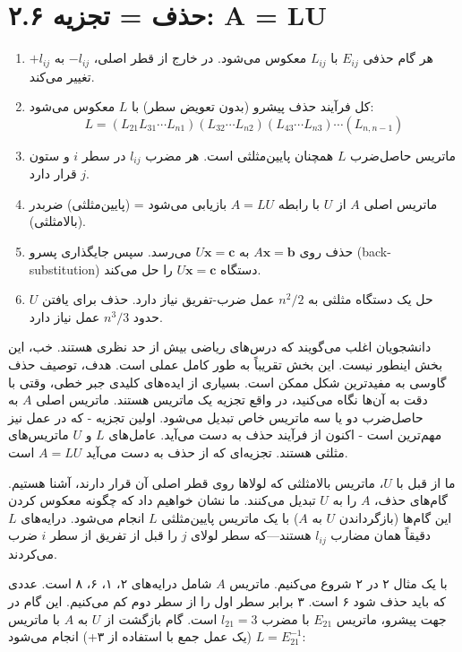\documentclass[12pt, a4paper]{book}
\begin{document}
	
	\onehalfspacing
	
	\section*{۲.۶ حذف = تجزیه: A = LU}
	
	\begin{enumerate}
		\item هر گام حذفی $E_{ij}$ با $L_{ij}$ معکوس می‌شود. در خارج از قطر اصلی، $-l_{ij}$ به $+l_{ij}$ تغییر می‌کند.
		\item کل فرآیند حذف پیشرو (بدون تعویض سطر) با $L$ معکوس می‌شود:
		\[ L = (L_{21}L_{31} \cdots L_{n1})(L_{32} \cdots L_{n2})(L_{43} \cdots L_{n3}) \cdots (L_{n,n-1}) \]
		\item ماتریس حاصل‌ضرب $L$ همچنان پایین‌مثلثی است. هر مضرب $l_{ij}$ در سطر $i$ و ستون $j$ قرار دارد.
		\item ماتریس اصلی $A$ از $U$ با رابطه $A = LU$ بازیابی می‌شود = (پایین‌مثلثی) ضربدر (بالامثلثی).
		\item حذف روی $A\mathbf{x} = \mathbf{b}$ به $U\mathbf{x} = \mathbf{c}$ می‌رسد. سپس جایگذاری پسرو (back-substitution) دستگاه $U\mathbf{x} = \mathbf{c}$ را حل می‌کند.
		\item حل یک دستگاه مثلثی به $n^2/2$ عمل ضرب-تفریق نیاز دارد. حذف برای یافتن $U$ حدود $n^3/3$ عمل نیاز دارد.
	\end{enumerate}
	
	دانشجویان اغلب می‌گویند که درس‌های ریاضی بیش از حد نظری هستند. خب، این بخش اینطور نیست. این بخش تقریباً به طور کامل عملی است. هدف، توصیف حذف گاوسی به مفیدترین شکل ممکن است. بسیاری از ایده‌های کلیدی جبر خطی، وقتی با دقت به آن‌ها نگاه می‌کنید، در واقع تجزیه یک ماتریس هستند. ماتریس اصلی $A$ به حاصل‌ضرب دو یا سه ماتریس خاص تبدیل می‌شود. اولین تجزیه - که در عمل نیز مهم‌ترین است - اکنون از فرآیند حذف به دست می‌آید. عامل‌های $L$ و $U$ ماتریس‌های مثلثی هستند. تجزیه‌ای که از حذف به دست می‌آید $A=LU$ است.
	
	ما از قبل با $U$، ماتریس بالامثلثی که لولاها روی قطر اصلی آن قرار دارند، آشنا هستیم. گام‌های حذف، $A$ را به $U$ تبدیل می‌کنند. ما نشان خواهیم داد که چگونه معکوس کردن این گام‌ها (بازگرداندن $U$ به $A$) با یک ماتریس پایین‌مثلثی $L$ انجام می‌شود. درایه‌های $L$ دقیقاً همان مضارب $l_{ij}$ هستند—که سطر لولای $j$ را قبل از تفریق از سطر $i$ ضرب می‌کردند.
	
	با یک مثال ۲ در ۲ شروع می‌کنیم. ماتریس $A$ شامل درایه‌های ۲، ۱، ۶، ۸ است. عددی که باید حذف شود ۶ است. ۳ برابر سطر اول را از سطر دوم کم می‌کنیم. این گام در جهت پیشرو، ماتریس $E_{21}$ با مضرب $l_{21}=3$ است. گام بازگشت از $U$ به $A$ با ماتریس $L=E_{21}^{-1}$ (یک عمل جمع با استفاده از ۳+) انجام می‌شود:
	
\end{document}
